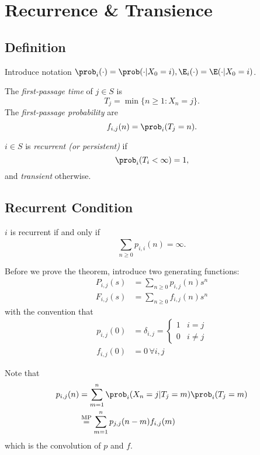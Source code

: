 \documentclass[a4paper]{article}
\begin{document}
\section{Recurrence \& Transience}

\subsection{Definition}

Introduce notation \(\prob_i(\cdot) = \prob(\cdot| X_0 = i), \E_i(\cdot) = \E(\cdot|X_0=i)\).

\begin{definition}
The \emph{first-passage time} of \(j\in S\) is
\[
T_j = \min \{n\geq 1: X_n=j\}.
\]
The \emph{first-passage probability} are
\[
f_{i,j}(n) = \prob_i(T_j=n).
\]
\end{definition}

\begin{definition}
  \(i\in S\) is \emph{recurrent (or persistent)} if
  \[
\prob_i(T_i < \infty) = 1,
  \]
  and \emph{transient} otherwise.
\end{definition}

\subsection{Recurrent Condition}

\begin{theorem}
  \label{thm:recurrent}
  \(i\) is recurrent if and only if
  \[
    \sum_{n\geq0}^{}p_{i,i}(n) = \infty.
  \]
\end{theorem}

Before we prove the theorem, introduce two generating functions:
\begin{align*}
  P_{i,j}(s) &= \sum_{n\geq0}^{ }p_{i,j}(n)s^n \\
  F_{i,j}(s) &= \sum_{n\geq0}^{ }f_{i,j}(n)s^n
\end{align*}
with the convention that
\begin{align*}
  p_{i,j}(0) &= \delta_{i,j} =
                 \begin{cases}
                   1 & i = j \\
                   0 & i \neq j
                 \end{cases}\\
  f_{i,j}(0) &= 0 \, \forall i,j
\end{align*}

Note that
\begin{align*}
  p_{i,j}(n) &= \sum_{m=1}^{n}\prob_i(X_n=j|T_j=m)\prob_i(T_j=m) \\
             &\stackrel{\text{MP}}{=} \sum_{m=1}^{n}p_{j,j}(n-m)f_{i,j}(m)
\end{align*}
which is the convolution of \(p\) and \(f\).
\end{document}
